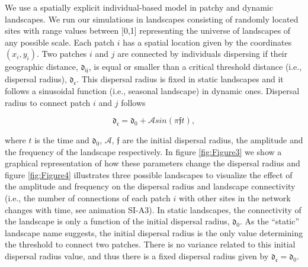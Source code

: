 \documentclass[12pt]{article}
\begin{document}
We use a spatially explicit individual-based model in patchy and dynamic landscapes. We run our simulations in landscapes consisting of randomly located sites with range values between [0,1] representing the universe of landscapes of any possible scale. Each patch $i$ has a spatial location given by the coordinates $(x_{i}, y_{i})$. Two patches $i$ and $j$ are connected by individuals dispersing if their geographic distance, $\mathfrak{d_{ij}}$, is equal or smaller than a
critical threshold distance (i.e., dispersal radius), $\mathfrak{d_{c}}$. This dispersal radius is fixed in static landscapes and it follows a sinusoidal function (i.e., seasonal landscape) in dynamic ones. Dispersal radius to connect patch $i$ and $j$ follows

\begin{equation}
\mathfrak{d_{c}} = \mathfrak{d_{0}} + \mathcal{A} sin (\pi \mathfrak{f} t),
\label{eq:ratioAf}
\end{equation}

where $t$ is the time and $\mathfrak{d_{0}}$, $\mathcal{A}$, $\mathfrak{f}$ are the initial dispersal radius, the amplitude and the frequency of the landscape respectively. In figure \ref{fig:Figure3} we show a graphical representation of how these parameters change the dispersal radius and figure \ref{fig:Figure4} illustrates three possible landscapes to visualize the effect of the amplitude and frequency on the dispersal radius and landscape connectivity (i.e., the number of connections of each patch $i$ with other sites in the network changes with time, see animation SI-A3). In static landscapes, the connectivity of the landscape is only a function of the initial dispersal radius, $\mathfrak{d_{0}}$. As the ``static'' landscape name suggests, the initial dispersal radius is the only value determining the threshold to connect
two patches. There is no variance related to this initial dispersal radius value, and thus there is a fixed dispersal radius given by $\mathfrak{d_{c}} = \mathfrak{d_{0}}$.
\end{document}
